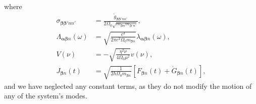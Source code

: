 \documentclass{article}
\begin{document}
where
\begin{equation}
\begin{split}
\sigma_{\bm{\beta}\bm{\beta}'nn'} &= \frac{\tilde{g}_{\bm{\beta}\bm{\beta}'nn'}}{2\Omega_0\sqrt{m_{\bm{\beta}n}m_{\bm{\beta}'n'}}},\\
\Lambda_{\bm{\alpha}\bm{\beta}n}(\omega) &= \sqrt{\frac{c^3}{2\pi e^2\Omega_0m_{\bm{\beta}n}}}\lambda_{\bm{\alpha}\bm{\beta}n}(\omega),\\
V(\nu) &= -\sqrt{\frac{\eta^2\nu}{4\Omega_0\mu^2}}v(\nu),\\
J_{\bm{\beta}n}(t) &= \sqrt{\frac{1}{2\hbar\Omega_0m_{\bm{\beta}n}}}\left[F_{\bm{\beta}n}(t) + \dot{G}_{\bm{\beta}n}(t)\right],
\end{split}
\end{equation}
and we have neglected any constant terms, as they do not modify the motion of any of the system's modes.
\end{document}
